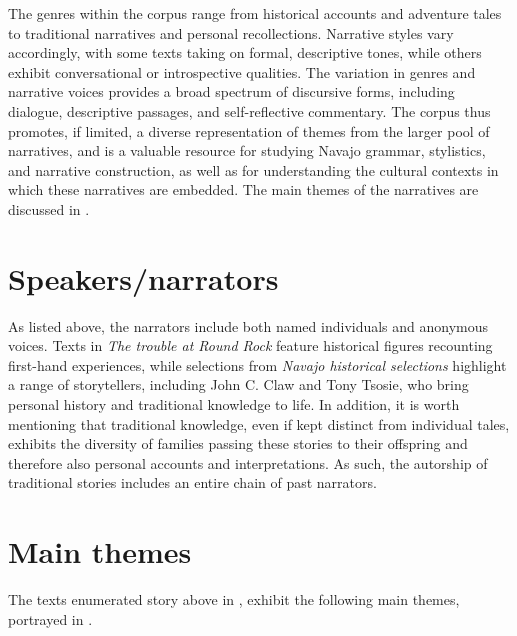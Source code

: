 The genres within the corpus range from historical accounts and adventure tales to traditional narratives and personal recollections. Narrative styles vary accordingly, with some texts taking on formal, descriptive tones, while others exhibit conversational or introspective qualities. The variation in genres and narrative voices provides a broad spectrum of discursive forms, including dialogue, descriptive passages, and self-reflective commentary. The corpus thus promotes, if limited, a diverse representation of themes from the larger pool of narratives, and is a valuable resource for studying Navajo grammar, stylistics, and narrative construction, as well as for understanding the cultural contexts in which these narratives are embedded. The main themes of the narratives are discussed in .

\section{Speakers/narrators}

As listed above, the narrators include both named individuals and anonymous voices. Texts in \textit{The trouble at Round Rock} feature historical figures recounting first-hand experiences, while selections from \textit{Navajo historical selections} highlight a range of storytellers, including John C. Claw and Tony Tsosie, who bring personal history and traditional knowledge to life. In addition, it is worth mentioning that traditional knowledge, even if kept distinct from individual tales, exhibits the diversity of families passing these stories to their offspring and therefore also personal accounts and interpretations. As such, the autorship of traditional stories includes an entire chain of past narrators.

\section{Main themes}\label{sec:themes}

The texts enumerated story above in , exhibit the following main themes, portrayed in .

